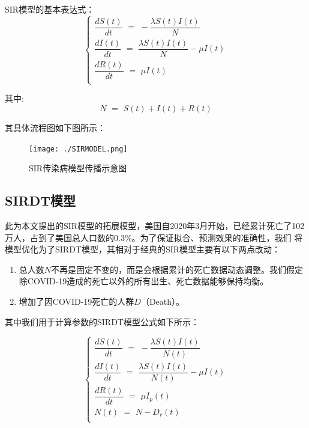 \documentclass[bwprint]{gmcmthesis}
\numberwithin{figure}{section}
\begin{document}
SIR模型的基本表达式：
\begin{equation} \label{}
    \begin{cases}
        \dfrac{dS\left( t \right)}{dt}\,\,=\,\,-\dfrac{\lambda S\left( t \right) I\left( t \right)}{N}\\
        \dfrac{dI\left( t \right)}{dt}\,\,=\,\,\dfrac{\lambda S\left( t \right) I\left( t \right)}{N}-\mu I\left( t \right)\\
        \dfrac{dR\left( t \right)}{dt}\,\,=\,\,\mu I\left( t \right)\\
    \end{cases}
\end{equation}

\par 其中:
\begin{equation} \label{}
    N\,\,=\,\,S\left( t \right) +I\left( t \right) +R\left( t \right) 
\end{equation}

\par 其具体流程图如下图所示：
\begin{figure}[!h]
\centering
\texttt{[image: ./SIRMODEL.png]}
\caption{SIR传染病模型传播示意图}
\label{fig1}
\end{figure}

\subsection{SIRDT模型}
\par 此为本文提出的SIR模型的拓展模型，美国自2020年3月开始，已经累计死亡了102万人，占到了美国总人口数的0.3$\%$。为了保证拟合、预测效果的准确性，我们
将模型优化为了SIRDT模型，其相对于经典的SIR模型主要有以下两点改动：

\begin{enumerate}
    \item 总人数$N$不再是固定不变的，而是会根据累计的死亡数据动态调整。我们假定除COVID-19造成的死亡以外的所有出生、死亡数据能够保持均衡。
    \item 增加了因COVID-19死亡的人群$D$（Death）。
\end{enumerate}

\par 其中我们用于计算参数的SIRDT模型公式如下所示：

\begin{equation} \label{}
    \begin{cases}
        \dfrac{dS\left( t \right)}{dt}\,\,=\,\,-\dfrac{\lambda S\left( t \right) I\left( t \right)}{N\left( t \right)}\\
        \dfrac{dI\left( t \right)}{dt}\,\,=\,\,\dfrac{\lambda S\left( t \right) I\left( t \right)}{N\left( t \right)}-\mu I\left( t \right)\\
        \dfrac{dR\left( t \right)}{dt}\,\,=\,\,\mu I_p\left( t \right)\\
        N\left( t \right) \,\,=\,\,N-D_r\left( t \right)\\
    \end{cases}
\end{equation}
\end{document}
